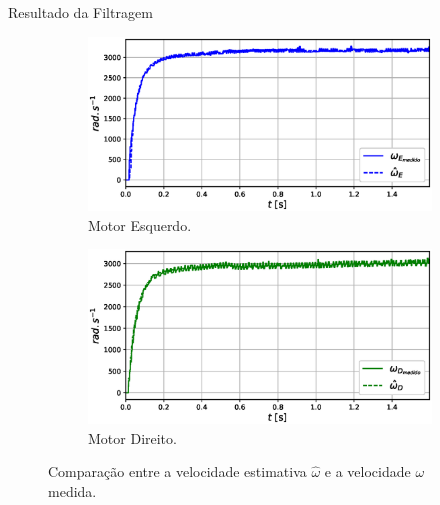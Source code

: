 \begin{frame}{Resultado da Filtragem}

    \begin{figure}
        \begin{subfigure}{.45\textwidth}
            \centering
            \includegraphics[width=\textwidth]{figuras/resultados/exp01/filtro_vs_sem_filtro_esquerdo100.eps}
            \caption{Motor Esquerdo.}
        \end{subfigure}
        \begin{subfigure}{.45\textwidth}
            \centering
            \includegraphics[width=\textwidth]{figuras/resultados/exp01/filtro_vs_sem_filtro_direito100.eps}
            \caption{Motor Direito.}
        \end{subfigure}
        \caption{Comparação entre a velocidade estimativa $\hat{\omega}$ e a velocidade $\omega$ medida.}
    \end{figure}
    
\end{frame}

